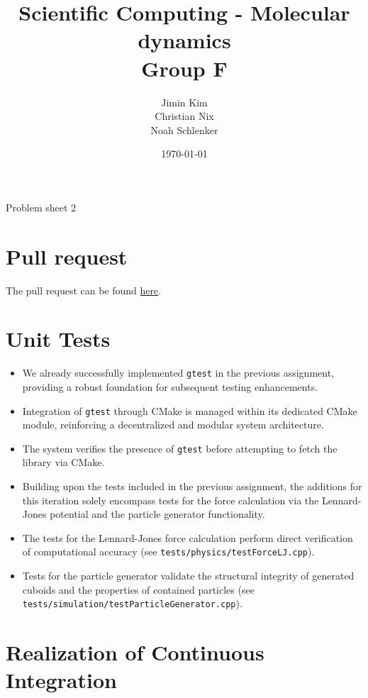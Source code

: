 \documentclass{article}
\title{Scientific Computing - Molecular dynamics \\ Group F}
\author{
    Jimin Kim \\
    Christian Nix \\
    Noah Schlenker
}
\date{\today}
\newcommand{\subtitle}{Problem sheet 2}
\begin{document}
\maketitle

\begin{center}
    \LARGE \subtitle{}
\end{center}

\section{Pull request}
The pull request can be found \href{https://github.com/noahpy/MolSim-SS24/pull/10}{here}.

\section{Unit Tests}

\begin{itemize}
    \item We already successfully implemented \verb|gtest| in the previous assignment, providing a robust foundation for subsequent testing enhancements.
    \item Integration of \verb|gtest| through CMake is managed within its dedicated CMake module, reinforcing a decentralized and modular system architecture.
    \item The system verifies the presence of \verb|gtest| before attempting to fetch the library via CMake.
    \item Building upon the tests included in the previous assignment, the additions for this iteration solely encompass tests for the force calculation via the Lennard-Jones potential and the particle generator functionality.
    \item The tests for the Lennard-Jones force calculation perform direct verification of computational accuracy (see \texttt{tests/physics/testForceLJ.cpp}).
    \item Tests for the particle generator validate the structural integrity of generated cuboids and the properties of contained particles \newline(see \texttt{tests/simulation/testParticleGenerator.cpp}).
\end{itemize}

\section{Realization of Continuous Integration}
\end{document}

